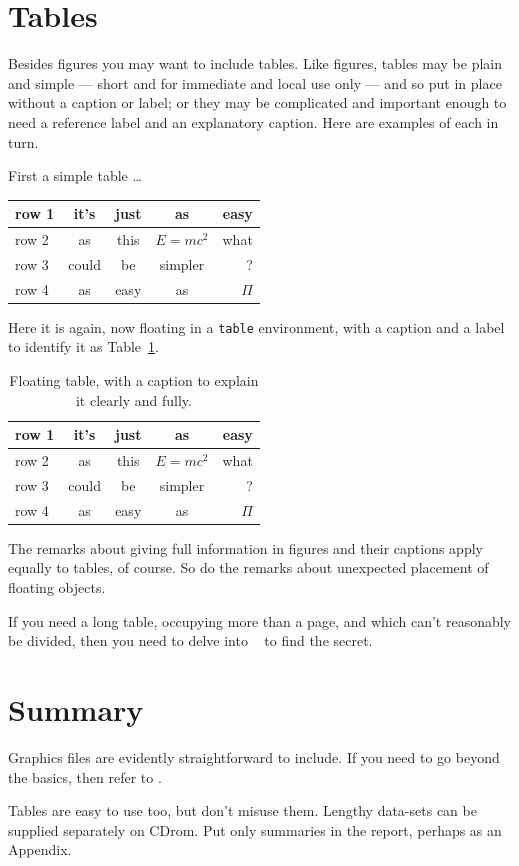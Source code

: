\section{Tables}\label{sec:tables}
Besides figures you may want to include tables. Like figures, tables may
be plain and simple --- short and for immediate and local use only ---
and so put in place without a caption or label; or they may be
complicated and important enough to need a reference label and an
explanatory caption. Here are examples of each in turn.
\par
First a simple table \dots\par
\begin{center}
 \begin{tabular}{|l||c|c|c|r|}
    \hline
    row 1& it's & just & as & easy \\ \hline
    row 2& as & this & \(E=mc^2\) & what \\ \hline
    row 3& could & be & simpler & ? \\ \hline
    row 4& as & easy & as & \(\Pi\) \\ \hline
  \end{tabular}
\end{center}
\par
Here it is again, now floating in a \texttt{table} environment, with
a caption and a label to identify it as Table~\ref{table:one}.
\begin{table}[h]
  \centering
\begin{tabular}{|l||c|c|c|r|}
    \hline
    row 1& it's & just & as & easy \\ \hline
    row 2& as & this & \(E=mc^2\) & what \\ \hline
    row 3& could & be & simpler & ? \\ \hline
    row 4& as & easy & as & \(\Pi\) \\ \hline
  \end{tabular}
  \caption{Floating table, with a caption to explain it 
clearly and fully.}\label{table:one}
\end{table}
The remarks about giving full information in figures and their
captions apply equally to tables, of course. So do the remarks about
unexpected placement of floating objects.
\par
If you need a long table, occupying more than a page, and which
can't reasonably be divided, then you need to delve into \comp\
\cite[Chap~5]{MG} to find the secret.
\section{Summary}
Graphics files are evidently straightforward to include. If you need
to go beyond the basics, then refer to \Quote{The Graphics Companion}
\cite{GRM}.
\par
Tables are easy to use too, but don't misuse them. Lengthy data-sets can
be supplied separately on CDrom. Put only summaries in the report,
perhaps as an Appendix.
